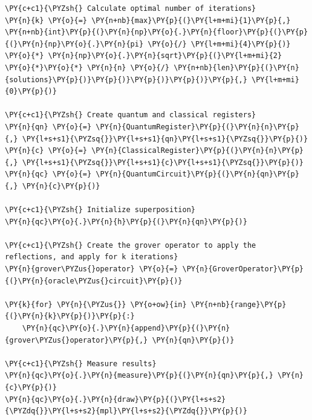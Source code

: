     \begin{tcolorbox}[breakable, size=fbox, boxrule=1pt, pad at break*=1mm,colback=cellbackground, colframe=cellborder]
\begin{Verbatim}[commandchars=\\\{\}]
\PY{c+c1}{\PYZsh{} Calculate optimal number of iterations}
\PY{n}{k} \PY{o}{=} \PY{n+nb}{max}\PY{p}{(}\PY{l+m+mi}{1}\PY{p}{,} \PY{n+nb}{int}\PY{p}{(}\PY{n}{np}\PY{o}{.}\PY{n}{floor}\PY{p}{(}\PY{p}{(}\PY{n}{np}\PY{o}{.}\PY{n}{pi} \PY{o}{/} \PY{l+m+mi}{4}\PY{p}{)} \PY{o}{*} \PY{n}{np}\PY{o}{.}\PY{n}{sqrt}\PY{p}{(}\PY{l+m+mi}{2} \PY{o}{*}\PY{o}{*} \PY{n}{n} \PY{o}{/} \PY{n+nb}{len}\PY{p}{(}\PY{n}{solutions}\PY{p}{)}\PY{p}{)}\PY{p}{)}\PY{p}{)}\PY{p}{,} \PY{l+m+mi}{0}\PY{p}{)}

\PY{c+c1}{\PYZsh{} Create quantum and classical registers}
\PY{n}{qn} \PY{o}{=} \PY{n}{QuantumRegister}\PY{p}{(}\PY{n}{n}\PY{p}{,} \PY{l+s+s1}{\PYZsq{}}\PY{l+s+s1}{qn}\PY{l+s+s1}{\PYZsq{}}\PY{p}{)}
\PY{n}{c} \PY{o}{=} \PY{n}{ClassicalRegister}\PY{p}{(}\PY{n}{n}\PY{p}{,} \PY{l+s+s1}{\PYZsq{}}\PY{l+s+s1}{c}\PY{l+s+s1}{\PYZsq{}}\PY{p}{)}
\PY{n}{qc} \PY{o}{=} \PY{n}{QuantumCircuit}\PY{p}{(}\PY{n}{qn}\PY{p}{,} \PY{n}{c}\PY{p}{)}

\PY{c+c1}{\PYZsh{} Initialize superposition}
\PY{n}{qc}\PY{o}{.}\PY{n}{h}\PY{p}{(}\PY{n}{qn}\PY{p}{)}
        
\PY{c+c1}{\PYZsh{} Create the grover operator to apply the reflections, and apply for k iterations}
\PY{n}{grover\PYZus{}operator} \PY{o}{=} \PY{n}{GroverOperator}\PY{p}{(}\PY{n}{oracle\PYZus{}circuit}\PY{p}{)}

\PY{k}{for} \PY{n}{\PYZus{}} \PY{o+ow}{in} \PY{n+nb}{range}\PY{p}{(}\PY{n}{k}\PY{p}{)}\PY{p}{:}
    \PY{n}{qc}\PY{o}{.}\PY{n}{append}\PY{p}{(}\PY{n}{grover\PYZus{}operator}\PY{p}{,} \PY{n}{qn}\PY{p}{)}

\PY{c+c1}{\PYZsh{} Measure results}
\PY{n}{qc}\PY{o}{.}\PY{n}{measure}\PY{p}{(}\PY{n}{qn}\PY{p}{,} \PY{n}{c}\PY{p}{)}
\PY{n}{qc}\PY{o}{.}\PY{n}{draw}\PY{p}{(}\PY{l+s+s2}{\PYZdq{}}\PY{l+s+s2}{mpl}\PY{l+s+s2}{\PYZdq{}}\PY{p}{)}
\end{Verbatim}
\end{tcolorbox}
 
            
    
    \begin{center}
    \end{center}
    { \hspace*{\fill} \\}
    

